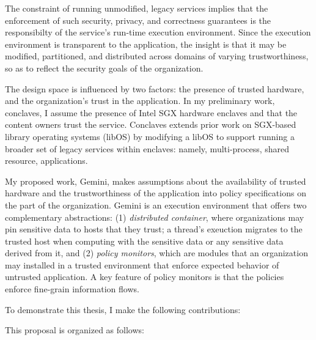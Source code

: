 The constraint of running unmodified, legacy services implies that the
enforcement of such security, privacy, and correctness guarantees is the
responsibilty of the service's run-time execution environment. 
%
Since the execution environment is transparent to the application, the insight
is that it may be modified, partitioned, and distributed across domains of
varying trustworthiness, so as to reflect the security goals of the
organization.


The design space is influenced by two factors: the presence of trusted
hardware, and the organization's trust in the application.
%
%
In my preliminary work, conclaves, I assume the presence of Intel SGX hardware
enclaves and that the content owners trust the service.
%
Conclaves extends prior work on SGX-based library operating systems (libOS) by
modifying a libOS to support running a broader set of legacy services
within enclaves: namely, multi-process, shared resource, applications.
%


My proposed work, Gemini, makes assumptions about the availability of trusted
hardware and the trustworthiness of the application into policy specifications
on the part of the organization.
%
Gemini is an execution environment that offers two complementary abstractions:
(1) \emph{distributed container}, where organizations may pin sensitive data to hosts
that they trust; a thread's exeuction migrates to the trusted host when
computing with the sensitive data or any sensitive data derived from it, and
(2) \emph{policy monitors}, which are modules that an organization may installed in a
trusted environment that enforce expected behavior of untrusted application.
%
A key feature of policy monitors is that the policies enforce fine-grain
information flows.


To demonstrate this thesis, I make the following contributions:

This proposal is organized as follows:






